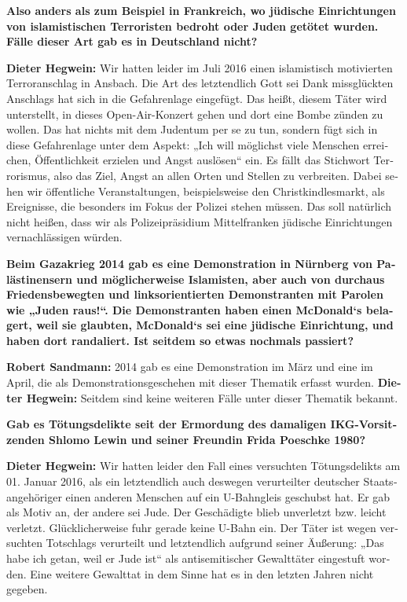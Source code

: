 \begin{otherlanguage}{ngerman}
\textbf{Also anders als zum Beispiel in Frankreich, wo jüdische Einrichtungen von islamistischen Terroristen bedroht oder Juden getötet wurden. Fälle dieser Art gab es in Deutschland nicht?}

\textbf{Dieter Hegwein:} Wir hatten leider im Juli 2016 einen islamistisch motivierten Terroranschlag in Ansbach. Die Art des letztendlich Gott sei Dank missglückten Anschlags hat sich in die Gefahrenlage eingefügt. Das heißt, diesem Täter wird unterstellt, in dieses Open-Air-Konzert gehen und dort eine Bombe zünden zu wollen. Das hat nichts mit dem Judentum per se zu tun, sondern fügt sich in diese Gefahrenlage unter dem Aspekt: „Ich will möglichst viele Menschen erreichen, Öffentlichkeit erzielen und Angst auslösen“ ein. Es fällt das Stichwort Terrorismus, also das Ziel, Angst an allen Orten und Stellen zu verbreiten. Dabei sehen wir öffentliche Veranstaltungen, beispielsweise den Christkindlesmarkt, als Ereignisse, die besonders im Fokus der Polizei stehen müssen. Das soll natürlich nicht heißen, dass wir als Polizeipräsidium Mittelfranken jüdische Einrichtungen vernachlässigen würden.

\textbf{Beim Gazakrieg 2014 gab es eine Demonstration in Nürnberg von Palästinensern und möglicherweise Islamisten, aber auch von durchaus Friedensbewegten und linksorientierten Demonstranten mit Parolen wie „Juden raus!“. Die Demonstranten haben einen McDonald‘s belagert, weil sie glaubten, McDonald‘s sei eine jüdische Einrichtung, und haben dort randaliert. Ist seitdem so etwas nochmals passiert?}

\textbf{Robert Sandmann:} 2014 gab es eine Demonstration im März und eine im April, die als Demonstrationsgeschehen mit dieser Thematik erfasst wurden.
\textbf{Dieter Hegwein:} Seitdem sind keine weiteren Fälle unter dieser Thematik bekannt.

\textbf{Gab es Tötungsdelikte seit der Ermordung des damaligen IKG-Vorsitzenden Shlomo Lewin und seiner Freundin Frida Poeschke 1980?}

\textbf{Dieter Hegwein:} Wir hatten leider den Fall eines versuchten Tötungsdelikts am 01. Januar 2016, als ein letztendlich auch deswegen verurteilter deutscher Staatsangehöriger einen anderen Menschen auf ein U-Bahngleis geschubst hat. Er gab als Motiv an, der andere sei Jude. Der Geschädigte blieb unverletzt bzw. leicht verletzt. Glücklicherweise fuhr gerade keine U-Bahn ein. Der Täter ist wegen versuchten Totschlags verurteilt und letztendlich aufgrund seiner Äußerung: „Das habe ich getan, weil er Jude ist“ als antisemitischer Gewalttäter eingestuft worden. Eine weitere Gewalttat in dem Sinne hat es in den letzten Jahren nicht gegeben. 


\end{otherlanguage}
